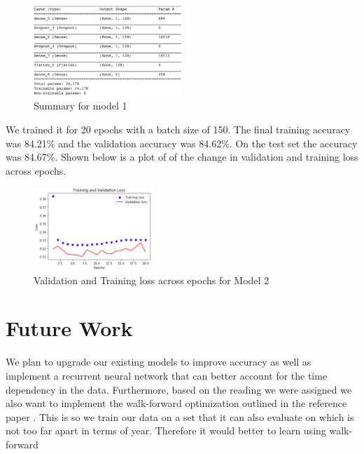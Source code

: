 \documentclass[conference]{IEEEtran}
\begin{document}
    \begin{figure}[H]
        \centering
        \captionsetup{justification=centering}
        \centering
            \includegraphics[width=0.5\textwidth]{m2_s.png}
            \caption{Summary for model 1}
    \end{figure}

    We trained it for 20 epochs with a batch size of 150. The final training accuracy was 84.21\% and the validation accuracy
    was 84.62\%. On the test set the accuracy was 84.67\%. Shown below is a plot of of the change in validation and training loss across epochs.

    \begin{figure}[H]
        \centering
        \captionsetup{justification=centering}
        \centering
            \includegraphics[width=0.4\textwidth]{m2_t.png}
            \caption{Validation and Training loss across epochs for Model 2}
    \end{figure}

    \section{Future Work}

    We plan to upgrade our existing models to improve accuracy as well as implement a recurrent neural network that can better account for the time dependency
    in the data. Furthermore, based on the reading we were assigned we also want to implement the walk-forward optimization outlined in the reference paper \cite{ref}.
    This is so we train our data on a set that it can also evaluate on which is not too far apart in terms of year. Therefore it would better to learn using walk-forward
    
\end{document}
